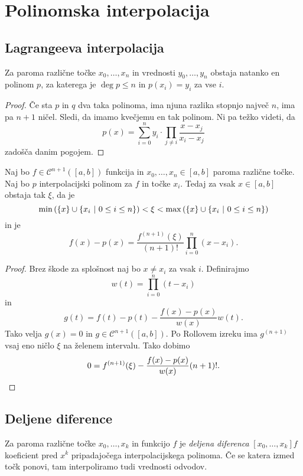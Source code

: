 \section{Polinomska interpolacija}

\subsection{Lagrangeeva interpolacija}

\begin{izrek}
Za paroma različne točke $x_0, \dots, x_n$ in vrednosti
$y_0, \dots, y_n$ obstaja natanko en polinom $p$, za katerega je
$\deg p \leq n$ in $p(x_i) = y_i$ za vse $i$.
\end{izrek}

\begin{proof}
Če sta $p$ in $q$ dva taka polinoma, ima njuna razlika stopnjo
največ $n$, ima pa $n+1$ ničel. Sledi, da imamo kvečjemu en tak
polinom. Ni pa težko videti, da
\[
p(x) =
\sum_{i=0}^n y_i \cdot \prod_{j \ne i} \frac{x - x_j}{x_i - x_j}
\]
zadošča danim pogojem.
\end{proof}

\begin{izrek}
Naj bo $f \in \mathcal{C}^{n+1}([a,b])$ funkcija in
$x_0, \dots, x_n \in [a,b]$ paroma različne točke. Naj bo $p$
interpolacijski polinom za $f$ in točke $x_i$. Tedaj za vsak
$x \in [a,b]$ obstaja tak $\xi$, da je
\[
\min \left(\left\{x\right\} \cup \left\{x_i~\middle\vert~0 \leq i \leq n\right\}\right) <
\xi <
\max \left(\left\{x\right\} \cup \left\{x_i~\middle\vert~0 \leq i \leq n\right\}\right)
\]
in je
\[
f(x) - p(x) =
\frac{f^{(n+1)}(\xi)}{(n+1)!} \prod_{i=0}^n (x - x_i).
\]
\end{izrek}

\begin{proof}
Brez škode za splošnost naj bo $x \ne x_i$ za vsak $i$. Definirajmo
\[
w(t) = \prod_{i=0}^n (t - x_i)
\]
in
\[
g(t) = f(t) - p(t) - \frac{f(x) - p(x)}{w(x)} w(t).
\]
Tako velja $g(x) = 0$ in $g \in \mathcal{C}^{n+1}([a,b])$. Po
Rollovem izreku ima $g^{(n+1)}$ vsaj eno ničlo $\xi$ na želenem
intervalu. Tako dobimo
\[
0 = f^{(n+1)}(\xi) - \frac{f(x) - p(x)}{w(x)} (n+1)!. \qedhere
\]
\end{proof}

\newpage

\subsection{Deljene diference}

\begin{definicija}
Za paroma različne točke $x_0, \dots, x_k$ in funkcijo $f$ je
\emph{deljena diferenca}
$[x_0, \dots, x_k] f$ koeficient pred $x^k$ pripadajočega
interpolacijskega polinoma. Če se katera izmed točk ponovi, tam
interpoliramo tudi vrednosti odvodov.
\end{definicija}

